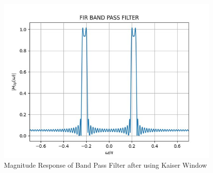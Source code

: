 \documentclass{article}
\begin{document}
\begin{figure}[H]
    \centering
    \includegraphics[width=1\columnwidth]{figs/FIR_Bandpass_Filter.png}
    \caption{Magnitude Response of Band Pass Filter after using Kaiser Window}
    \label{fig:Kaiser_BPF_response}
\end{figure}
\end{document}
